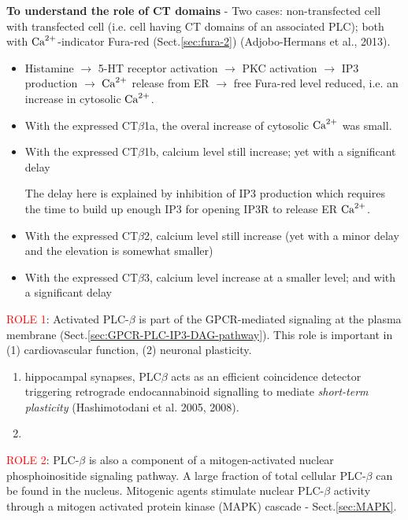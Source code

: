 \begin{mdframed}

{\bf To understand the role of CT domains} - Two cases: non-transfected cell
with transfected cell (i.e. cell having CT domains of an associated PLC); both
with ${\text{Ca}^{2+}}$-indicator Fura-red (Sect.\ref{sec:fura-2}) (Adjobo-Hermans et al.,
2013). 
\begin{itemize}
  \item Histamine $\rightarrow$ 5-HT receptor activation $\rightarrow$ PKC
  activation $\rightarrow$ IP3 production $\rightarrow$ ${\text{Ca}^{2+}}$ release from ER 
  $\rightarrow$ free Fura-red level reduced, i.e. an increase in cytosolic
  ${\text{Ca}^{2+}}$.
  
  \item With the expressed CT$\beta$1a, the overal increase of cytosolic ${\text{Ca}^{2+}}$
  was small. 
  
  \item With the expressed CT$\beta$1b, calcium level still increase; yet with a
  significant delay 
  
The delay here is explained by inhibition of IP3 production which requires the
time to build up enough IP3 for opening IP3R to release ER ${\text{Ca}^{2+}}$. 

  
  \item With the expressed CT$\beta$2, calcium level still increase (yet with
  a minor delay and the elevation is somewhat smaller)
  
  \item With the expressed CT$\beta$3, calcium level increase at a smaller
  level; and with a significant delay
\end{itemize}

\end{mdframed}

\textcolor{red}{ROLE 1}: Activated PLC-$\beta$ is part of the GPCR-mediated
signaling at the plasma membrane (Sect.\ref{sec:GPCR-PLC-IP3-DAG-pathway}).
This role is important in (1) cardiovascular function, (2) neuronal plasticity.
\begin{enumerate}
  \item  hippocampal synapses, PLC$\beta$ acts as an efficient
coincidence detector triggering retrograde endocannabinoid
signalling to mediate {\it short-term plasticity}
(Hashimotodani et al. 2005, 2008).

  \item  
\end{enumerate}

\textcolor{red}{ROLE 2}: PLC-$\beta$ is also a component of a mitogen-activated
nuclear phosphoinositide signaling pathway. A large fraction of total cellular
PLC-$\beta$ can be found in the nucleus.
Mitogenic agents stimulate nuclear PLC-$\beta$ activity through a mitogen
activated protein kinase (MAPK) cascade - Sect.\ref{sec:MAPK}.

